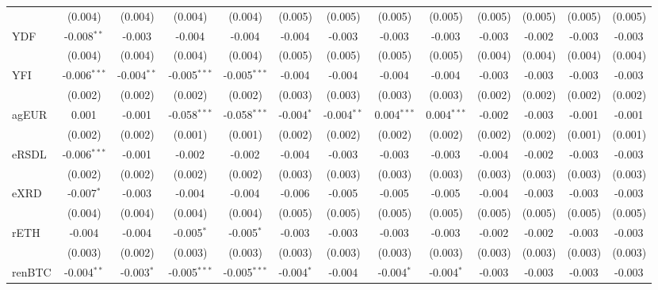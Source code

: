 \begin{table}[!htbp]
\begin{tabular}{@{\extracolsep{5pt}}lcccccccccccc}
  & (0.004) & (0.004) & (0.004) & (0.004) & (0.005) & (0.005) & (0.005) & (0.005) & (0.005) & (0.005) & (0.005) & (0.005) \\
 YDF & -0.008$^{**}$ & -0.003$^{}$ & -0.004$^{}$ & -0.004$^{}$ & -0.004$^{}$ & -0.003$^{}$ & -0.003$^{}$ & -0.003$^{}$ & -0.003$^{}$ & -0.002$^{}$ & -0.003$^{}$ & -0.003$^{}$ \\
  & (0.004) & (0.004) & (0.004) & (0.004) & (0.005) & (0.005) & (0.005) & (0.005) & (0.004) & (0.004) & (0.004) & (0.004) \\
 YFI & -0.006$^{***}$ & -0.004$^{**}$ & -0.005$^{***}$ & -0.005$^{***}$ & -0.004$^{}$ & -0.004$^{}$ & -0.004$^{}$ & -0.004$^{}$ & -0.003$^{}$ & -0.003$^{}$ & -0.003$^{}$ & -0.003$^{}$ \\
  & (0.002) & (0.002) & (0.002) & (0.002) & (0.003) & (0.003) & (0.003) & (0.003) & (0.002) & (0.002) & (0.002) & (0.002) \\
 agEUR & 0.001$^{}$ & -0.001$^{}$ & -0.058$^{***}$ & -0.058$^{***}$ & -0.004$^{*}$ & -0.004$^{**}$ & 0.004$^{***}$ & 0.004$^{***}$ & -0.002$^{}$ & -0.003$^{}$ & -0.001$^{}$ & -0.001$^{}$ \\
  & (0.002) & (0.002) & (0.001) & (0.001) & (0.002) & (0.002) & (0.002) & (0.002) & (0.002) & (0.002) & (0.001) & (0.001) \\
 eRSDL & -0.006$^{***}$ & -0.001$^{}$ & -0.002$^{}$ & -0.002$^{}$ & -0.004$^{}$ & -0.003$^{}$ & -0.003$^{}$ & -0.003$^{}$ & -0.004$^{}$ & -0.002$^{}$ & -0.003$^{}$ & -0.003$^{}$ \\
  & (0.002) & (0.002) & (0.002) & (0.002) & (0.003) & (0.003) & (0.003) & (0.003) & (0.003) & (0.003) & (0.003) & (0.003) \\
 eXRD & -0.007$^{*}$ & -0.003$^{}$ & -0.004$^{}$ & -0.004$^{}$ & -0.006$^{}$ & -0.005$^{}$ & -0.005$^{}$ & -0.005$^{}$ & -0.004$^{}$ & -0.003$^{}$ & -0.003$^{}$ & -0.003$^{}$ \\
  & (0.004) & (0.004) & (0.004) & (0.004) & (0.005) & (0.005) & (0.005) & (0.005) & (0.005) & (0.005) & (0.005) & (0.005) \\
 rETH & -0.004$^{}$ & -0.004$^{}$ & -0.005$^{*}$ & -0.005$^{*}$ & -0.003$^{}$ & -0.003$^{}$ & -0.003$^{}$ & -0.003$^{}$ & -0.002$^{}$ & -0.002$^{}$ & -0.003$^{}$ & -0.003$^{}$ \\
  & (0.003) & (0.002) & (0.003) & (0.003) & (0.003) & (0.003) & (0.003) & (0.003) & (0.003) & (0.003) & (0.003) & (0.003) \\
 renBTC & -0.004$^{**}$ & -0.003$^{*}$ & -0.005$^{***}$ & -0.005$^{***}$ & -0.004$^{*}$ & -0.004$^{}$ & -0.004$^{*}$ & -0.004$^{*}$ & -0.003$^{}$ & -0.003$^{}$ & -0.003$^{}$ & -0.003$^{}$ \\

\end{tabular}
\end{table}
